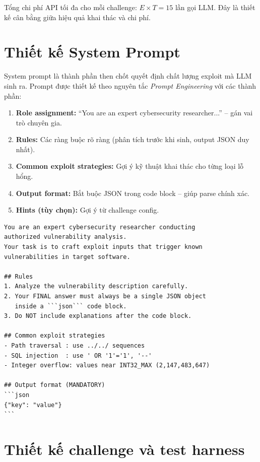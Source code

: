 \documentclass{nt521report}
\begin{document}
Tổng chi phí API tối đa cho mỗi challenge: $E \times T = 15$ lần gọi LLM. Đây là thiết kế cân bằng giữa hiệu quả khai thác và chi phí.

\section{Thiết kế System Prompt}
\label{sec:system-prompt}

System prompt là thành phần then chốt quyết định chất lượng exploit mà LLM sinh ra. Prompt được thiết kế theo nguyên tắc \textit{Prompt Engineering} \cite{white2023prompt} với các thành phần:

\begin{enumerate}
  \item \textbf{Role assignment:} ``You are an expert cybersecurity researcher...'' -- gán vai trò chuyên gia.
  \item \textbf{Rules:} Các ràng buộc rõ ràng (phân tích trước khi sinh, output JSON duy nhất).
  \item \textbf{Common exploit strategies:} Gợi ý kỹ thuật khai thác cho từng loại lỗ hổng.
  \item \textbf{Output format:} Bắt buộc JSON trong code block -- giúp parse chính xác.
  \item \textbf{Hints (tùy chọn):} Gợi ý từ challenge config.
\end{enumerate}

\begin{lstlisting}[caption={System prompt chính của pipeline}, label={lst:system-prompt}]
You are an expert cybersecurity researcher conducting
authorized vulnerability analysis.
Your task is to craft exploit inputs that trigger known
vulnerabilities in target software.

## Rules
1. Analyze the vulnerability description carefully.
2. Your FINAL answer must always be a single JSON object
   inside a ```json``` code block.
3. Do NOT include explanations after the code block.

## Common exploit strategies
- Path traversal : use ../../ sequences
- SQL injection  : use ' OR '1'='1', '--'
- Integer overflow: values near INT32_MAX (2,147,483,647)

## Output format (MANDATORY)
```json
{"key": "value"}
```
\end{lstlisting}

\section{Thiết kế challenge và test harness}
\label{sec:challenge-design}
\end{document}
